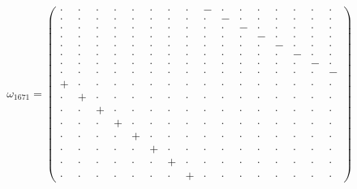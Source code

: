 \documentclass[
  10pt,
]{article}
\begin{document}
\[\omega_{1671}=\left(\begin{smallmatrix} \cdot & \cdot & \cdot & \cdot & \cdot & \cdot & \cdot & \cdot & - & \cdot & \cdot & \cdot & \cdot & \cdot & \cdot & \cdot \\ \cdot & \cdot & \cdot & \cdot & \cdot & \cdot & \cdot & \cdot & \cdot & - & \cdot & \cdot & \cdot & \cdot & \cdot & \cdot \\ \cdot & \cdot & \cdot & \cdot & \cdot & \cdot & \cdot & \cdot & \cdot & \cdot & - & \cdot & \cdot & \cdot & \cdot & \cdot \\ \cdot & \cdot & \cdot & \cdot & \cdot & \cdot & \cdot & \cdot & \cdot & \cdot & \cdot & - & \cdot & \cdot & \cdot & \cdot \\ \cdot & \cdot & \cdot & \cdot & \cdot & \cdot & \cdot & \cdot & \cdot & \cdot & \cdot & \cdot & - & \cdot & \cdot & \cdot \\ \cdot & \cdot & \cdot & \cdot & \cdot & \cdot & \cdot & \cdot & \cdot & \cdot & \cdot & \cdot & \cdot & - & \cdot & \cdot \\ \cdot & \cdot & \cdot & \cdot & \cdot & \cdot & \cdot & \cdot & \cdot & \cdot & \cdot & \cdot & \cdot & \cdot & - & \cdot \\ \cdot & \cdot & \cdot & \cdot & \cdot & \cdot & \cdot & \cdot & \cdot & \cdot & \cdot & \cdot & \cdot & \cdot & \cdot & - \\ + & \cdot & \cdot & \cdot & \cdot & \cdot & \cdot & \cdot & \cdot & \cdot & \cdot & \cdot & \cdot & \cdot & \cdot & \cdot \\ \cdot & + & \cdot & \cdot & \cdot & \cdot & \cdot & \cdot & \cdot & \cdot & \cdot & \cdot & \cdot & \cdot & \cdot & \cdot \\ \cdot & \cdot & + & \cdot & \cdot & \cdot & \cdot & \cdot & \cdot & \cdot & \cdot & \cdot & \cdot & \cdot & \cdot & \cdot \\ \cdot & \cdot & \cdot & + & \cdot & \cdot & \cdot & \cdot & \cdot & \cdot & \cdot & \cdot & \cdot & \cdot & \cdot & \cdot \\ \cdot & \cdot & \cdot & \cdot & + & \cdot & \cdot & \cdot & \cdot & \cdot & \cdot & \cdot & \cdot & \cdot & \cdot & \cdot \\ \cdot & \cdot & \cdot & \cdot & \cdot & + & \cdot & \cdot & \cdot & \cdot & \cdot & \cdot & \cdot & \cdot & \cdot & \cdot \\ \cdot & \cdot & \cdot & \cdot & \cdot & \cdot & + & \cdot & \cdot & \cdot & \cdot & \cdot & \cdot & \cdot & \cdot & \cdot \\ \cdot & \cdot & \cdot & \cdot & \cdot & \cdot & \cdot & + & \cdot & \cdot & \cdot & \cdot & \cdot & \cdot & \cdot & \cdot \end{smallmatrix}\right)\qquad
\]
\end{document}
